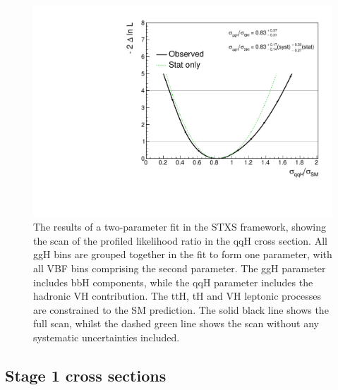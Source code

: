 \begin{figure}[hptb]
  \centering
  \includegraphics[width=\textwidth]{Figures/Results/ObsStage0_r_qqH.pdf}
  \caption[Likelihood scan for the qqH parameter in a two-parameter fit.]
  {
    The results of a two-parameter fit in the STXS framework,
    showing the scan of the profiled likelihood ratio in the qqH cross section.
    All ggH bins are grouped together in the fit to form one parameter, 
    with all VBF bins comprising the second parameter.
    The ggH parameter includes bbH components, 
    while the qqH parameter includes the hadronic VH contribution. 
    The ttH, tH and VH leptonic processes are constrained to the SM prediction. 
    The solid black line shows the full scan, 
    whilst the dashed green line shows the scan without any systematic uncertainties included.
  }
  \label{fig:results_Stage0_qqH}
\end{figure}

\subsection{Stage 1 cross sections}


